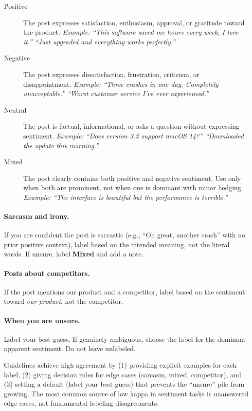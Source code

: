 \begin{description}
    \item[Positive] The post expresses satisfaction, enthusiasm, approval, or gratitude toward the product. \emph{Example: ``This software saved me hours every week, I love it.'' ``Just upgraded and everything works perfectly.''}

    \item[Negative] The post expresses dissatisfaction, frustration, criticism, or disappointment. \emph{Example: ``Three crashes in one day. Completely unacceptable.'' ``Worst customer service I've ever experienced.''}

    \item[Neutral] The post is factual, informational, or asks a question without expressing sentiment. \emph{Example: ``Does version 3.2 support macOS 14?'' ``Downloaded the update this morning.''}

    \item[Mixed] The post clearly contains both positive and negative sentiment. Use only when both are prominent, not when one is dominant with minor hedging. \emph{Example: ``The interface is beautiful but the performance is terrible.''}
\end{description}

\paragraph{Sarcasm and irony.}
If you are confident the post is sarcastic (e.g., ``Oh great, another crash'' with no prior positive context), label based on the intended meaning, not the literal words. If unsure, label \textbf{Mixed} and add a note.

\paragraph{Posts about competitors.}
If the post mentions our product and a competitor, label based on the sentiment toward \emph{our product}, not the competitor.

\paragraph{When you are unsure.}
Label your best guess. If genuinely ambiguous, choose the label for the dominant apparent sentiment. Do not leave unlabeled.

\begin{technote}
Guidelines achieve high agreement by (1) providing explicit examples for each label, (2) giving decision rules for edge cases (sarcasm, mixed, competitor), and (3) setting a default (label your best guess) that prevents the ``unsure'' pile from growing. The most common source of low kappa in sentiment tasks is unanswered edge cases, not fundamental labeling disagreements.
\end{technote}

